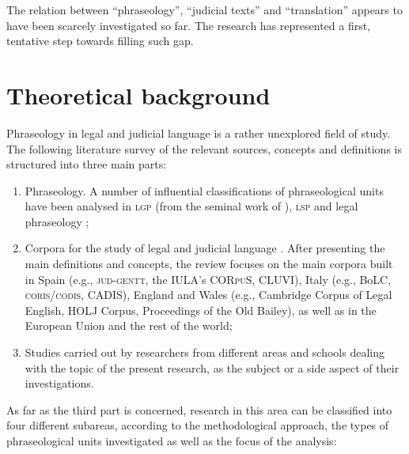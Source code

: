 \documentclass[output=paper]{LSP/langsci}
\begin{document}
The relation between “phraseology”, “judicial texts” and “translation” appears to have been scarcely investigated so far. The research has represented a first, tentative step towards filling such gap.

\section{Theoretical background}
Phraseology in legal and judicial language is a rather unexplored field of study. The following literature survey of the relevant sources, concepts and definitions is structured into three main parts:

\begin{enumerate}
\item Phraseology. A number of influential classifications of phraseological units have been analysed in \textsc{lgp} (from the seminal work of \citealt{Benson1986,Corpas1996,Gläser1994/1995,Glaeser1998,Ruiz1997,Cowie1988,Cowie2001,Melchuk1998, Moon1998,Burger1998,Granger2008}), \textsc{lsp}  \citep{Homme2000,Lorente2001,Tercedor1999,Montero2002,Bevilacqua2004,Aguado2007} and legal phraseology \citep {Kjær1990,Kjaer1990b};
\item Corpora for the study of legal and judicial language \citep[see][]{Pontrandolfo2012}. After presenting the main definitions and concepts, the review focuses on the main corpora built in Spain (e.g., \textsc{jud}-\textsc{gentt}, the IULA’s COR\textsc{pu}S, CLUVI), Italy (e.g., BoLC, \textsc{coris}/\textsc{codis}, CADIS), England and Wales (e.g., Cambridge Corpus of Legal English, HOLJ Corpus, Proceedings of the Old Bailey), as well as in the European Union and the rest of the world;
\item Studies carried out by researchers from different areas and schools dealing with the topic of the present research, as the subject or a side aspect of their investigations.
\end{enumerate}

As far as the third part is concerned, research in this area can be classified into four different subareas, according to the methodological approach, the types of phraseological units investigated as well as the focus of the analysis:
\end{document}
